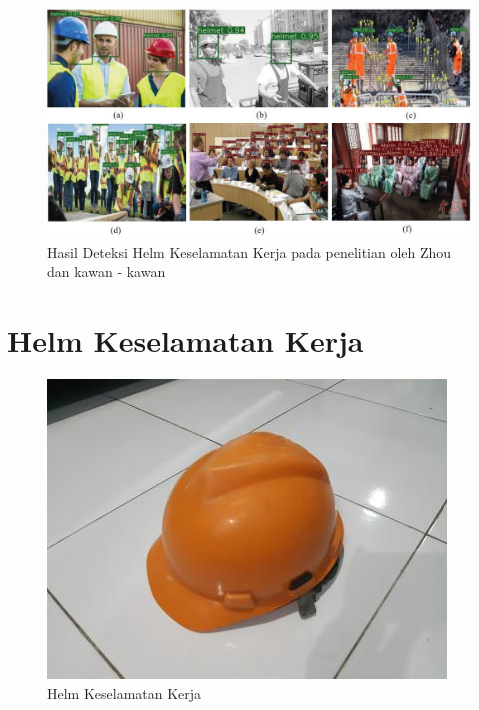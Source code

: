 \begin{figure}[ht]
    \centering
    \includegraphics[scale=0.7]{gambar/zhou_le.jpg}
    \caption{Hasil Deteksi Helm Keselamatan Kerja pada penelitian oleh Zhou dan kawan - kawan}
    \label{fig:zhouimage}  
\end{figure}







\section{Helm Keselamatan Kerja}
\label{sec:helmkeselamatankerja}

\begin{figure}[ht]
    \centering
    \includegraphics[scale=0.7]{gambar/safety_helmet.jpg}
    \caption{Helm Keselamatan Kerja}
    \label{fig:helmkeselamatankerja}  
\end{figure}

